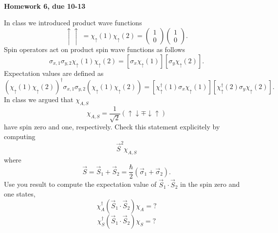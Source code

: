    
\pagestyle{plain}

\centerline{\bf\Large Homework 6, due 10-13}
\vspace*{0.5cm}

In class we introduced product wave functions
\[
 \uparrow\uparrow\; = \chi_\uparrow(1)
\chi_\uparrow(2)=
\left(\begin{array}{c}1 \\ 0\end{array}\right)
\left(\begin{array}{c}1 \\ 0\end{array}\right).
\]
Spin operators act on product spin wave 
functions as follows
\[
\sigma_{x,1}\sigma_{y,2} 
 \chi_\uparrow(1)\chi_\uparrow(2)=
\left[ \sigma_{x}\chi_\uparrow (1)\right]
\left[ \sigma_{y}\chi_\uparrow (2)\right].
\]
Expectation values are defined as
\[
( \chi_\uparrow(1)\chi_\uparrow(2) )^\dagger
\sigma_{x,1}\sigma_{y,2} 
( \chi_\uparrow(1)\chi_\uparrow(2) ) =
\left[ \chi_\uparrow^\dagger (1)\sigma_{x}\chi_\uparrow (1)\right]
\left[ \chi_\uparrow^\dagger (2)\sigma_{y}\chi_\uparrow (2)\right].
\]
In class we argued that $\chi_{A,S}$
\[
\chi_{A,S}=\frac{1}{\sqrt{2}}
\left( \uparrow\downarrow \mp \downarrow\uparrow
 \right)
\]
have spin zero and one, respectively. Check this 
statement explicitely by computing 
\[
 \vec{S}^2\chi_{A,S}
\]
where 
\[
\vec{S} = \vec{S}_1+\vec{S}_2 = \frac{\hbar}{2}\left(\vec{\sigma}_1
 +\vec{\sigma}_2 \right).
\]
Use you result to compute the expectation value
of $\vec{S}_1\cdot\vec{S}_2$ in the spin zero and
one states,
\[
 \chi_A^\dagger (\vec{S}_1\cdot\vec{S}_2) \chi_A = ?
\]
\[
 \chi_S^\dagger (\vec{S}_1\cdot\vec{S}_2) \chi_S = ?
\]



   
 

 


  

